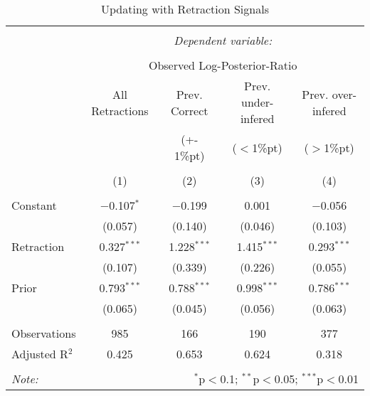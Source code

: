 
\begin{table}[!htbp] \centering 
  \caption{Updating with Retraction Signals} 
  \label{tab:retractions_inference} 
\begin{tabular}{@{\extracolsep{5pt}}lcccc} 
\\[-1.8ex]\hline 
\hline \\[-1.8ex] 
 & \multicolumn{4}{c}{\textit{Dependent variable:}} \\ 
\cline{2-5} 
\\[-1.8ex] & \multicolumn{4}{c}{Observed Log-Posterior-Ratio} 
\\ & All Retractions & Prev. Correct  & Prev. under-infered  & Prev. over-infered 
\\ & & (+- 1\%pt) & ($<$1\%pt) & ($>$1\%pt) \\
\\[-1.8ex] & (1) & (2) & (3) & (4)\\ 
\hline \\[-1.8ex] 
 Constant & $-$0.107$^{*}$ & $-$0.199 & 0.001 & $-$0.056 \\ 
  & (0.057) & (0.140) & (0.046) & (0.103) \\ 
  Retraction & 0.327$^{***}$ & 1.228$^{***}$ & 1.415$^{***}$ & 0.293$^{***}$ \\ 
  & (0.107) & (0.339) & (0.226) & (0.055) \\ 
  Prior & 0.793$^{***}$ & 0.788$^{***}$ & 0.998$^{***}$ & 0.786$^{***}$ \\ 
  & (0.065) & (0.045) & (0.056) & (0.063) \\ 
 \hline \\[-1.8ex] 
Observations & 985 & 166 & 190 & 377 \\ 
Adjusted R$^{2}$ & 0.425 & 0.653 & 0.624 & 0.318 \\ 
\hline 
\hline \\[-1.8ex] 
\textit{Note:}  & \multicolumn{4}{r}{$^{*}$p$<$0.1; $^{**}$p$<$0.05; $^{***}$p$<$0.01} \\ 
\end{tabular} 
\end{table} 
